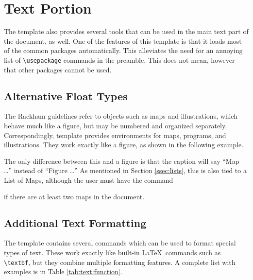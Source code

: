 \documentclass[thesis]{../cls/thesis-umich}
\begin{document}
\section{Text Portion}
The template also provides several tools that can be used in the main
text part of the document, as well.  One of the features of this
template is that it loads most of the common packages automatically.
This alleviates the need for an annoying list of \verb|\usepackage|
commands in the preamble.  This does not mean, however that other
packages cannot be used.


\subsection{Alternative Float Types}  \label{ssec:float}
The Rackham guidelines refer to objects such as maps and illustrations,
which behave much like a figure, but may be numbered and organized
separately. Correspondingly, template provides environments for maps,
programs, and illustrations.  They work exactly like a figure, as shown
in the following example.
\begin{code}
\begin{map}
 \centering
 \caption{...}
\end{map}
\end{code}
The only difference between this and a figure is that the caption will
say ``Map \ldots'' instead of ``Figure \ldots''  As mentioned in Section
\ref{ssec:lists}, this is also tied to a List of Maps, although the user
must have the command
\begin{code}
\showlistofmaps
\end{code}
if there are at least two maps in the document.

\subsection{Additional Text Formatting}
The template contains several commands which can be used to format
special types of text.  These work exactly like built-in
\LaTeX~commands such as \verb|\textbf|, but they combine multiple
formatting features.  A complete list with examples is in Table
\ref{tab:text:function}.
\end{document}
